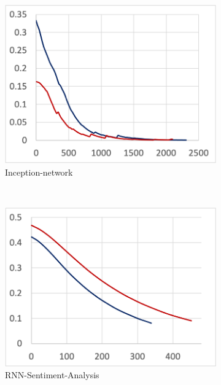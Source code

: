 \begin{figure}[!ht]
  \begin{subfigure}[t]{.24\textwidth}
    \includegraphics[width=\textwidth]{tf2-07}
    \caption{Inception-network}
  \end{subfigure}
  ~
  \begin{subfigure}[t]{.24\textwidth}
    \includegraphics[width=\textwidth]{tf2-09}
    \caption{RNN-Sentiment-Analysis}
  \end{subfigure} 
  ~ 
  \begin{subfigure}[t]{.24\textwidth}

\end{subfigure}
\end{figure}
